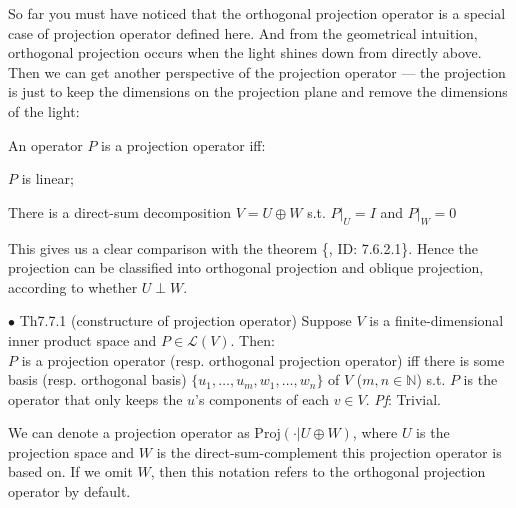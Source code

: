\documentclass{article}
\begin{document}
\begin{Rmk}{}
    So far you must have noticed that \textcolor{Th}{the orthogonal projection operator is a special case of projection operator defined here.} And from the geometrical intuition, orthogonal projection occurs when the light shines down from directly above. Then we can get another perspective of the projection operator — the projection is just to keep the dimensions on the projection plane and remove the dimensions of the light:
    \textcolor{Th}{An operator $P$ is a projection operator iff:
    \begin{compactenum}
        \item $P$ is linear;
        \item There is a direct-sum decomposition $V = U\oplus W$ s.t. $P|_U = I$ and $P|_W = 0$
    \end{compactenum}    
    }
    This gives us a clear comparison with the theorem \{, ID: 7.6.2.1\}. Hence \textcolor{Df}{the projection can be classified into orthogonal projection and oblique projection, according to whether $U\perp W$.}
\end{Rmk}

\begin{Th}{$\bullet$ Th7.7.1 (constructure of projection operator)}
    Suppose $V$ is a finite-dimensional inner product space and $P\in\mathcal{L}(V)$. Then:\\
    $P$ is a projection operator (resp. orthogonal projection operator) iff there is some basis (resp. orthogonal basis) $\{u_1, \dots, u_m, w_1, \dots, w_n\}$ of $V$ ($m, n\in\mathbb{N}$) s.t. $P$ is the operator that only keeps the $u$'s components of each $v\in V$. 
    \tcblower
    \textit{Pf}: Trivial.
\end{Th}

\begin{Rmk}{}
    \textcolor{Df}{We can denote a projection operator as $\text{Proj}(\cdot|U\oplus W)$, where $U$ is the projection space and $W$ is the direct-sum-complement this projection operator is based on. If we omit $W$, then this notation refers to the orthogonal projection operator by default.} 
\end{Rmk}
\end{document}
